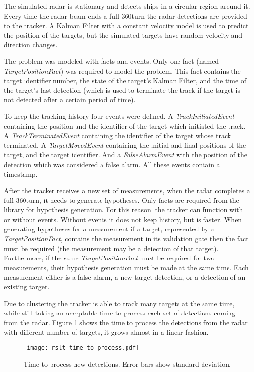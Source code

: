 The simulated radar is stationary and detects ships in a circular region around it. 
Every time the radar beam ends a full 360\degree turn the radar detections are provided to the tracker.
A Kalman Filter with a constant velocity model is used to predict the position of the targets, but the simulated targets have random velocity and direction changes.

The problem was modeled with facts and events. Only one fact (named \textit{TargetPositionFact}) was required to model the problem. This fact contains the target identifier number, the state of the target's Kalman Filter, and the time of the target's last detection (which is used to terminate the track if the target is not detected after a certain period of time).

To keep the tracking history four events were defined. 
A \textit{TrackInitiatedEvent} containing the position and the identifier of the target which initiated the track. 
A \textit{TrackTerminatedEvent} containing the identifier of the target whose track terminated. 
A \textit{TargetMovedEvent} containing the initial and final positions of the target, and the target identifier. 
And a \textit{FalseAlarmEvent} with the position of the detection which was considered a false alarm. All these events contain a timestamp.

After the tracker receives a new set of measurements, when the radar completes a full 360\degree turn, it needs to generate hypotheses. Only facts are required from the library for hypothesis generation. For this reason, the tracker can function with or without events. Without events it does not keep history, but is faster.
When generating hypotheses for a measurement if a target, represented by a \textit{TargetPositionFact}, contains the measurement in its validation gate then the fact must be required (the measurement may be a detection of that target). Furthermore, if the same \textit{TargetPositionFact} must be required for two measurements, their hypothesis generation must be made at the same time. Each measurement either is a false alarm, a new target detection, or a detection of an existing target.

Due to clustering the tracker is able to track many targets at the same time, while still taking an acceptable time to process each set of detections coming from the radar. Figure \ref{fig:timeToProcess} shows the time to process the detections from the radar with different number of targets, it grows almost in a linear fashion.

\ifx \ommitimages  \undefined
\begin{figure}
\begin{minipage}[b]{1\textwidth}
\centering
\texttt{[image: rslt\_time\_to\_process.pdf]}
\caption{Time to process new detections. Error bars show standard deviation.}
\label{fig:timeToProcess}
\end{minipage}
\end{figure}
\fi


